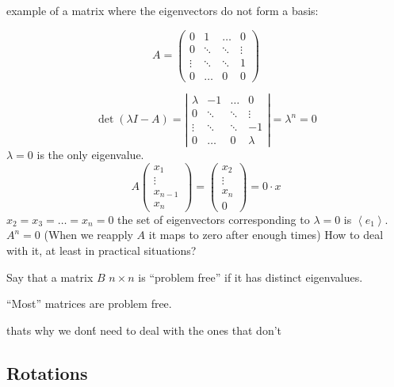 \begin{example}
example of a matrix where the eigenvectors do not form a basis:
\end{example}

\[
A=\left(\begin{array}{cccc}
0 & 1 & \dots & 0\\
0 & \ddots & \ddots & \vdots\\
\vdots & \ddots & \ddots & 1\\
0 & \dots & 0 & 0
\end{array}\right)
\]
 
\[
\det\left(\lambda I-A\right)=\left|\begin{array}{cccc}
\lambda & -1 & \dots & 0\\
0 & \ddots & \ddots & \vdots\\
\vdots & \ddots & \ddots & -1\\
0 & \dots & 0 & \lambda
\end{array}\right|=\lambda^{n}=0
\]
$\lambda=0$ is the only eigenvalue.
\[
A\left(\begin{array}{c}
x_{1}\\
\vdots\\
x_{n-1}\\
x_{n}
\end{array}\right)=\left(\begin{array}{c}
x_{2}\\
\vdots\\
x_{n}\\
0
\end{array}\right)=0\cdot x
\]
 $x_{2}=x_{3}=\dots=x_{n}=0$ the set of eigenvectors corresponding
to $\lambda=0$ is $\left\langle e_{1}\right\rangle $. $A^{n}=0$
(When we reapply $A$ it maps to zero after enough times) How to deal
with it, at least in practical situations?
\begin{definition}
Say that a matrix $B$ $n\times n$ is ``problem free'' if it has
distinct eigenvalues.
\end{definition}

\begin{fact}
``Most'' matrices are problem free. %
\begin{insight}
thats why we don\'{t} need to deal with the ones that don't%
\end{insight}
\end{fact}


\subsection{Rotations}

